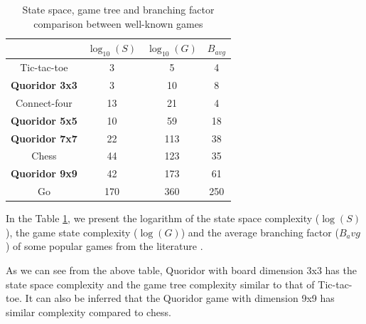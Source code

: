 \begin{table}[ht]
    \centering
     \begin{tabular}{|c|c|c|c|}\hline
          & $\log_{10}(S)$ & $\log_{10}(G)$ & $B_{avg}$\\ \hline 
          Tic-tac-toe  & 3   & 5   & 4    \\ \hline
  \textbf{Quoridor 3x3} & 3  & 10  & 8  \\ \hline
          Connect-four & 13  & 21  & 4    \\ \hline
  \textbf{Quoridor 5x5} & 10  & 59 & 18  \\ \hline
  \textbf{Quoridor 7x7}  & 22  & 113 & 38  \\ \hline
          Chess        & 44  & 123 & 35   \\ \hline
  \textbf{Quoridor 9x9}     & 42  & 173 & 61  \\ \hline        
          Go           & 170 & 360 & 250 \\ \hline
     \end{tabular}
     \caption{State space, game tree and branching factor comparison between well-known games}
     \label{tab:comparison}
 \end{table}

 In the Table \ref{tab:comparison}, we present the logarithm of the state space complexity ($\log(S)$), the game state complexity ($\log(G)$) and the average branching factor ($B_avg$) of some popular games from the literature \citep{Mertens2006Quoridor}.

 As we can see from the above table, Quoridor with board dimension 3x3 has the state space complexity and the game tree complexity similar to that of Tic-tac-toe. It can also be inferred that the Quoridor game with dimension 9x9 has similar complexity compared to chess.
 